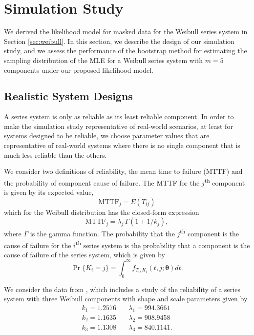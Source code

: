 \documentclass[
]{article}
\begin{document}
\hypertarget{simstudy}{%
\section{Simulation Study}\label{simstudy}}

We derived the likelihood model for masked data for the Weibull series
system in Section \ref{sec:weibull}. In this section, we describe the
design of our simulation study, and we assess the performance of the
bootstrap method for estimating the sampling distribution of the MLE for
a Weibull series system with \(m=5\) components under our proposed
likelihood model.

\hypertarget{sec:reliability}{%
\subsection{Realistic System Designs}\label{sec:reliability}}

A series system is only as reliable as its least reliable component. In
order to make the simulation study representative of real-world
scenarios, at least for systems designed to be reliable, we choose
parameter values that are representative of real-world systems where
there is no single component that is much less reliable than the others.

We consider two definitions of reliability, the mean time to failure
(MTTF) and the probability of component cause of failure. The MTTF for
the \(j\)\textsuperscript{th} component is given by its expected value,
\[
\text{MTTF}_j = E(T_{i j})
\] which for the Weibull distribution has the closed-form expression \[
\text{MTTF}_j = \lambda_j \, \Gamma(1 + 1/k_j),
\] where \(\Gamma\) is the gamma function. The probability that the
\(j\)\textsuperscript{th} component is the cause of failure for the
\(i\)\textsuperscript{th} series system is the probability that a
component is the cause of failure of the series system, which is given
by \[
\Pr\{K_i = j\} = \int_{0}^\infty f_{T_i, K_i}(t, j ; \boldsymbol{\theta}) dt.
\]

We consider the data from \citep{Huairu-2013}, which includes a study of
the reliability of a series system with three Weibull components with
shape and scale parameters given by \begin{equation}
\begin{aligned}
    k_1 = 1.2576 &\quad \lambda_1 = 994.3661\\
    k_2 = 1.1635 &\quad \lambda_2 = 908.9458\\
    k_3 = 1.1308 &\quad \lambda_3 = 840.1141.
\end{aligned}
\end{equation}
\end{document}
